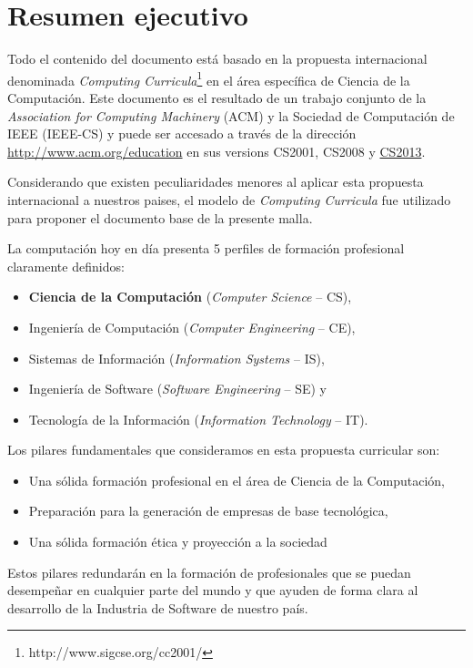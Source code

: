  \chapter*{Resumen ejecutivo}
\AbstractIntro

Todo el contenido del documento está basado en la propuesta internacional denominada \textit{Computing Curricula}\footnote{http://www.sigcse.org/cc2001/} 
en el área específica de Ciencia de la Computación. Este documento es el resultado de un trabajo conjunto de la 
\textit{Association for Computing Machinery} (ACM) y la Sociedad de Computación de IEEE (IEEE-CS) y 
puede ser accesado a través de la dirección \href{http://www.acm.org/education}{http://www.acm.org/education} 
en sus versions CS2001, CS2008 y \href{cs2013.org}{CS2013}.

Considerando que existen peculiaridades menores al aplicar esta propuesta internacional a nuestros paises, el modelo de \textit{Computing Curricula} 
fue utilizado para proponer el documento base de la presente malla. 

\noindent La computación hoy en día presenta 5 perfiles de formación profesional claramente definidos: 
\begin{itemize}
\item \textbf{Ciencia de la Computación} (\textit{Computer Science} -- CS),
\item Ingeniería de Computación (\textit{Computer Engineering} -- CE),
\item Sistemas de Información (\textit{Information Systems} -- IS),
\item Ingeniería de Software (\textit{Software Engineering} -- SE) y 
\item Tecnología de la Información (\textit{Information Technology} -- IT).
\end{itemize}

Los pilares fundamentales que consideramos en esta propuesta curricular son:
\begin{itemize}
\item Una sólida formación profesional en el área de Ciencia de la Computación,
\item Preparación para la generación de empresas de base tecnológica,
\item Una sólida formación ética y proyección a la sociedad
\end{itemize}

Estos pilares redundarán en la formación de profesionales que se puedan desempeñar en 
cualquier parte del mundo y que ayuden de forma clara al desarrollo de la Industria 
de Software de nuestro país. 

